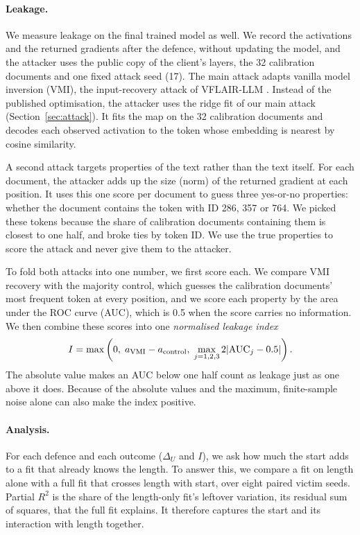 \documentclass[11pt]{article}
\begin{document}
\paragraph{Leakage.}
We measure leakage on the final trained model as well. We record the activations and the returned gradients after the defence, without updating the model, and the attacker uses the public copy of the client's layers, the 32 calibration documents and one fixed attack seed (17). The main attack adapts vanilla model inversion (VMI), the input-recovery attack of VFLAIR-LLM \cite{vflair}. Instead of the published optimisation, the attacker uses the ridge fit of our main attack (Section~\ref{sec:attack}). It fits the map on the 32 calibration documents and decodes each observed activation to the token whose embedding is nearest by cosine similarity.

A second attack targets properties of the text rather than the text itself. For each document, the attacker adds up the size (norm) of the returned gradient at each position. It uses this one score per document to guess three yes-or-no properties: whether the document contains the token with ID 286, 357 or 764. We picked these tokens because the share of calibration documents containing them is closest to one half, and broke ties by token ID. We use the true properties to score the attack and never give them to the attacker.

To fold both attacks into one number, we first score each. We compare VMI recovery with the majority control, which guesses the calibration documents' most frequent token at every position, and we score each property by the area under the ROC curve (AUC), which is 0.5 when the score carries no information. We then combine these scores into one \emph{normalised leakage index}
\begin{equation}
I=\max\left(0,\;a_{\rm VMI}-a_{\rm control},\;\max_{j=1,2,3}2|\mathrm{AUC}_j-0.5|\right).
\end{equation}
The absolute value makes an AUC below one half count as leakage just as one above it does. Because of the absolute values and the maximum, finite-sample noise alone can also make the index positive.

\paragraph{Analysis.}
For each defence and each outcome ($\Delta_U$ and $I$), we ask how much the start adds to a fit that already knows the length. To answer this, we compare a fit on length alone with a full fit that crosses length with start, over eight paired victim seeds. Partial $R^2$ is the share of the length-only fit's leftover variation, its residual sum of squares, that the full fit explains. It therefore captures the start and its interaction with length together.
\end{document}
